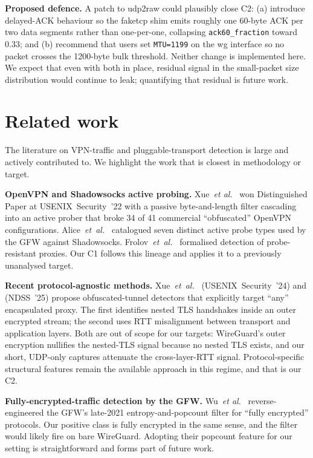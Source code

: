 \documentclass[conference]{IEEEtran}
\begin{document}
\textbf{Proposed defence.} A patch to udp2raw could plausibly close C2:
(a) introduce delayed-ACK behaviour so the faketcp shim emits roughly
one 60-byte ACK per two data segments rather than one-per-one,
collapsing \texttt{ack60\_fraction} toward $0.33$; and (b) recommend
that users set \texttt{MTU=1199} on the wg interface so no packet
crosses the 1200-byte bulk threshold. Neither change is implemented
here. We expect that even with both in place, residual signal in the
small-packet size distribution would continue to leak; quantifying that
residual is future work.

\section{Related work}
\label{sec:related}

The literature on VPN-traffic and pluggable-transport detection is large
and actively contributed to. We highlight the work that is closest in
methodology or target.

\textbf{OpenVPN and Shadowsocks active probing.}
Xue~\textit{et al.}~\cite{xue2022openvpn} won Distinguished Paper at
USENIX~Security~'22 with a passive byte-and-length filter cascading into
an active prober that broke 34 of 41 commercial ``obfuscated'' OpenVPN
configurations. Alice~\textit{et~al.}~\cite{alice2020shadowsocks}
catalogued seven distinct active probe types used by the GFW against
Shadowsocks. Frolov~\textit{et~al.}~\cite{frolov2020probe} formalised
detection of probe-resistant proxies. Our C1 follows this lineage and
applies it to a previously unanalysed target.

\textbf{Recent protocol-agnostic methods.}
Xue~\textit{et~al.}~\cite{xue2024obfuscated} (USENIX~Security~'24) and
\cite{xue2025crosslayer} (NDSS~'25) propose obfuscated-tunnel detectors
that explicitly target ``any'' encapsulated proxy. The first identifies
nested TLS handshakes inside an outer encrypted stream; the second uses
RTT misalignment between transport and application layers. Both are out
of scope for our targets: WireGuard's outer encryption nullifies the
nested-TLS signal because no nested TLS exists, and our short, UDP-only
captures attenuate the cross-layer-RTT signal. Protocol-specific
structural features remain the available approach in this regime, and
that is our C2.

\textbf{Fully-encrypted-traffic detection by the GFW.}
Wu~\textit{et al.}~\cite{wu2023gfw} reverse-engineered the GFW's late-2021
entropy-and-popcount filter for ``fully encrypted'' protocols. Our positive
class is fully encrypted in the same sense, and the filter would likely
fire on bare WireGuard. Adopting their popcount feature for our setting
is straightforward and forms part of future work.
\end{document}

